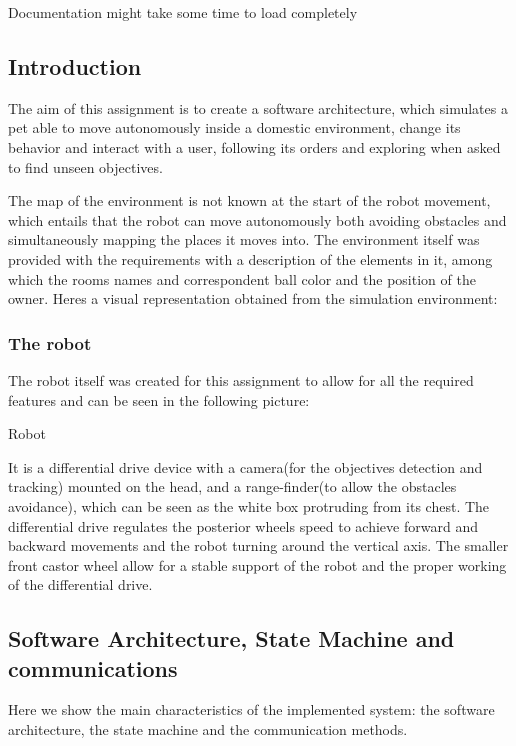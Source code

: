 Documentation might take some time to load completely

\subsection*{Introduction}

The aim of this assignment is to create a software architecture, which simulates a pet able to move autonomously inside a domestic environment, change its behavior and interact with a user, following its orders and exploring when asked to find unseen objectives.

The map of the environment is not known at the start of the robot movement, which entails that the robot can move autonomously both avoiding obstacles and simultaneously mapping the places it moves into. The environment itself was provided with the requirements with a description of the elements in it, among which the rooms names and correspondent ball color and the position of the owner. Here\textquotesingle{}s a visual representation obtained from the simulation environment\+: 

\subsubsection*{The robot}

The robot itself was created for this assignment to allow for all the required features and can be seen in the following picture\+:  

Robot 

It is a differential drive device with a camera(for the objectives detection and tracking) mounted on the head, and a range-\/finder(to allow the obstacles avoidance), which can be seen as the white box protruding from its chest. The differential drive regulates the posterior wheels speed to achieve forward and backward movements and the robot turning around the vertical axis. The smaller front castor wheel allow for a stable support of the robot and the proper working of the differential drive.

\subsection*{Software Architecture, State Machine and communications}

Here we show the main characteristics of the implemented system\+: the software architecture, the state machine and the communication methods.

